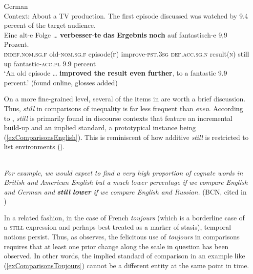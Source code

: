 {\begin{exe}
	\ex German\label{exComparisonsGermanVerbesserte}\\
	Context: About a TV production. The first episode discussed was watched by 9.4 percent of the target audience.\\
	\gll Eine alt-e Folge … \textbf{verbesser}-\textbf{te} \textbf{das} \textbf{Ergebnis} \textbf{noch} auf fantastisch-e 9,9 Prozent.\\
\textsc{indef}.\textsc{nom}.\textsc{sg}.\textsc{f} old-\textsc{nom}.\textsc{sg}.\textsc{f} episode(\textsc{f}) {} improve-\textsc{pst}.3\textsc{sg} \textsc{def}.\textsc{acc}.\textsc{sg}.\textsc{n} result(\textsc{n}) still up fantastic-\textsc{acc}.\textsc{pl} 9.9 percent\\
\glt \lq{}An old episode … \textbf{improved the result even further}, to a fantastic 9.9 percent.' (found online, glosses added)%
\end{exe}

On a more fine-grained level, several of the items in  are worth a brief discussion. Thus,  \textit{still} in comparisons of inequality is far less frequent than \textit{even}. According to \textcite[198–201]{Ranger2018}, \textit{still} is primarily found in discourse contexts that feature an incremental build-up and an implied standard, a prototypical instance being (\ref{exComparisonsEnglish}). This is reminiscent of how additive \textit{still} is restricted to list environments (). 

\begin{exe}
	\ex {}\label{exComparisonsEnglish}\\
	\textit{For example, we would expect to find a very high proportion of cognate words in British and American English but a much lower percentage if we compare English and German and \textbf{still} \textbf{lower} if we compare English and Russian.} (BCN, cited in \cite[200]{Ranger2018})
\end{exe}

In a related fashion, in the case of French \textit{toujours} (which is a borderline case of a \textsc{still} expression and perhaps best treated as a marker of stasis), temporal notions persist. Thus, as \textcite[166–167]{MosegaardHansen2008} observes, the felicitous use of \textit{toujours} in comparisons requires that at least one prior change along the scale in question has been observed. In other words, the implied standard of comparison in an example like (\ref{exComparisonsToujours}) cannot be a different entity at the same point in time.

}
